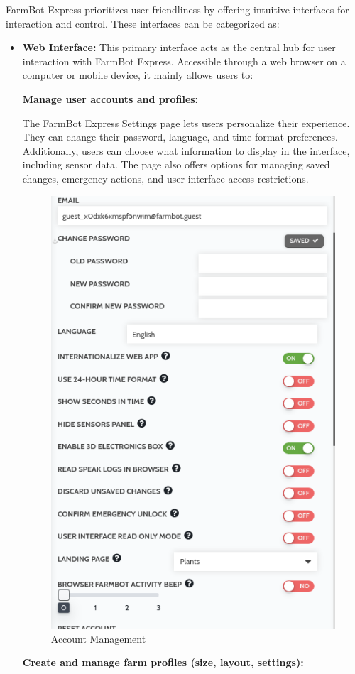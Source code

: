 FarmBot Express prioritizes user-friendliness by offering intuitive interfaces for interaction and control. These interfaces can be categorized as:
\begin{itemize}

    \item \textbf{Web Interface:} This primary interface acts as the central hub for user interaction with FarmBot Express. Accessible through a web browser on a computer or mobile device, it mainly allows users to:
    
    \textbf{Manage user accounts and profiles:}

    The FarmBot Express Settings page lets users personalize their experience. They can change their password, language, and time format preferences. Additionally, users can choose what information to display in the interface, including sensor data. The page also offers options for managing saved changes, emergency actions, and user interface access restrictions.

    \begin{figure}[H]
        \centering
        \includegraphics[width=0.6\linewidth]{Figures/ui_user_acc.png}
        \caption{Account Management}
        \label{fig:ui_acc}
    \end{figure}
    
     
    
    \textbf{Create and manage farm profiles (size, layout, settings):}


\end{itemize}
